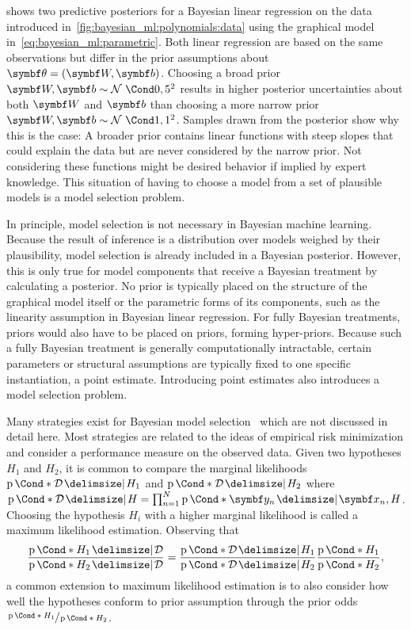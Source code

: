  shows two predictive posteriors for a Bayesian linear regression on the data introduced in~\cref{fig:bayesian_ml:polynomials:data} using the graphical model in~\cref{eq:bayesian_ml:parametric}.
Both linear regression are based on the same observations but differ in the prior assumptions about $\mat{\theta} = (\mat{W}, \mat{b})$.
Choosing a broad prior $\mat{W}, \mat{b} \sim \Gaussian{0, 5^2}$ results in higher posterior uncertainties about both $\mat{W}$ and $\mat{b}$ than choosing a more narrow prior $\mat{W}, \mat{b} \sim \Gaussian{1, 1^2}$.
Samples drawn from the posterior show why this is the case:
A broader prior contains linear functions with steep slopes that could explain the data but are never considered by the narrow prior.
Not considering these functions might be desired behavior if implied by expert knowledge.
This situation of having to choose a model from a set of plausible models is a model selection problem.

In principle, model selection is not necessary in Bayesian machine learning.
Because the result of inference is a distribution over models weighed by their plausibility, model selection is already included in a Bayesian posterior.
However, this is only true for model components that receive a Bayesian treatment by calculating a posterior.
No prior is typically placed on the structure of the graphical model itself or the parametric forms of its components, such as the linearity assumption in Bayesian linear regression.
For fully Bayesian treatments, priors would also have to be placed on priors, forming hyper-priors.
Because such a fully Bayesian treatment is generally computationally intractable, certain parameters or structural assumptions are typically fixed to one specific instantiation, a point estimate.
Introducing point estimates also introduces a model selection problem.

Many strategies exist for Bayesian model selection~\parencite{andrew_gelman_bayesian_2013,murphy_machine_2012,david_barber_bayesian_2012} which are not discussed in detail here.
Most strategies are related to the ideas of empirical risk minimization and consider a performance measure on the observed data.
Given two hypotheses $H_1$ and $H_2$, it is common to compare the marginal likelihoods $\Prob*{\Dc \given H_1}$ and $\Prob*{\Dc \given H_2}$ where $\Prob*{\Dc \given H} = \prod_{n=1}^N \Prob*{\mat{y}_n \given \mat{x}_n, H}$.
Choosing the hypothesis $H_i$ with a higher marginal likelihood is called a maximum likelihood estimation.
Observing that
\begin{equation}
\begin{split}
    \frac{\Prob*{H_1 \given \Dc}}{\Prob*{H_2 \given \Dc}} = \frac{\Prob*{\Dc \given H_1}}{\Prob*{\Dc \given H_2}} \frac{\Prob*{H_1}}{\Prob*{H_2}},
\end{split}
\end{equation}
a common extension to maximum likelihood estimation is to also consider how well the hypotheses conform to prior assumption through the prior odds $\sfrac{\Prob*{H_1}}{\Prob*{H_2}}$.


